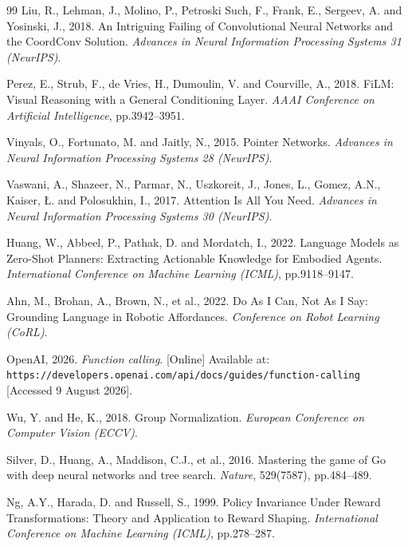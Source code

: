 \begin{thebibliography}{99}
Liu, R., Lehman, J., Molino, P., Petroski Such, F., Frank, E., Sergeev, A. and
Yosinski, J., 2018.
An Intriguing Failing of Convolutional Neural Networks and the CoordConv Solution.
\textit{Advances in Neural Information Processing Systems 31 (NeurIPS)}.

Perez, E., Strub, F., de Vries, H., Dumoulin, V. and Courville, A., 2018.
FiLM: Visual Reasoning with a General Conditioning Layer.
\textit{AAAI Conference on Artificial Intelligence}, pp.3942--3951.

Vinyals, O., Fortunato, M. and Jaitly, N., 2015.
Pointer Networks.
\textit{Advances in Neural Information Processing Systems 28 (NeurIPS)}.

Vaswani, A., Shazeer, N., Parmar, N., Uszkoreit, J., Jones, L., Gomez, A.N.,
Kaiser, {\L}. and Polosukhin, I., 2017.
Attention Is All You Need.
\textit{Advances in Neural Information Processing Systems 30 (NeurIPS)}.

Huang, W., Abbeel, P., Pathak, D. and Mordatch, I., 2022.
Language Models as Zero-Shot Planners: Extracting Actionable Knowledge for
Embodied Agents.
\textit{International Conference on Machine Learning (ICML)}, pp.9118--9147.

Ahn, M., Brohan, A., Brown, N., et al., 2022.
Do As I Can, Not As I Say: Grounding Language in Robotic Affordances.
\textit{Conference on Robot Learning (CoRL)}.

OpenAI, 2026. \textit{Function calling}. [Online]
Available at: \texttt{https://developers.openai.com/api/docs/guides/function-calling}
[Accessed 9 August 2026].

Wu, Y. and He, K., 2018.
Group Normalization.
\textit{European Conference on Computer Vision (ECCV)}.

Silver, D., Huang, A., Maddison, C.J., et al., 2016.
Mastering the game of Go with deep neural networks and tree search.
\textit{Nature}, 529(7587), pp.484--489.

Ng, A.Y., Harada, D. and Russell, S., 1999.
Policy Invariance Under Reward Transformations: Theory and Application to
Reward Shaping.
\textit{International Conference on Machine Learning (ICML)}, pp.278--287.


\end{thebibliography}
